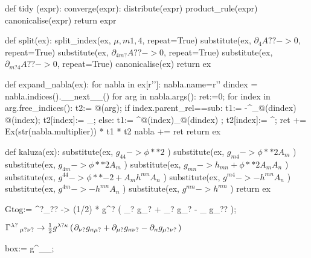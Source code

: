 \documentclass[10pt]{article}
\newcommand\brwrap[3]{%
  \setbox0=\hbox{$#2$}
  \left#1\vbox to \the\ht0{\hbox to 0pt{}}\right.\kern-.2em
  \begingroup #2\endgroup\kern-.15em
  \left.\vbox to \the\ht0{\hbox to 0pt{}}\right#3
}
\begin{document}
\begin{python}
def tidy (expr):
   converge(expr):
       distribute(expr)
       product_rule(expr)
       canonicalise(expr)
   return expr
\end{python}
\begin{python}
def split(ex):
	split_index(ex, $\mu, m1, 4$, repeat=True)
	substitute(ex, $\partial_{4}{A??} -> 0$, repeat=True)
	substitute(ex, $\partial_{4 m?}{A??} -> 0$, repeat=True)
	substitute(ex, $\partial_{m? 4}{A??} -> 0$, repeat=True)
	canonicalise(ex)
	return ex
\end{python}
\begin{python}
def expand_nabla(ex):
    for nabla in ex[r'\nabla']:
        nabla.name=r'\partial'
        dindex = nabla.indices().__next__() 
        for arg in nabla.args():             
            ret:=0;
            for index in arg.free_indices():
                t2:= @(arg);
                if index.parent_rel==sub:
                    t1:= -\Gamma^{\rho}_{@(dindex) @(index)};
                    t2[index]:= _{\rho};
                else:
                    t1:=  \Gamma^{@(index)}_{@(dindex) \rho};
                    t2[index]:= ^{\rho};
                ret += Ex(str(nabla.multiplier)) * t1 * t2
            nabla += ret
    return ex
\end{python}
\begin{python}
def kaluza(ex):
	substitute(ex, $g_{4 4} -> \phi**{2}$ )
	substitute(ex, $g_{m 4} -> \phi**{2} A_{m}$ )
	substitute(ex, $g_{4 m} -> \phi**{2} A_{m}$ )
	substitute(ex, $g_{m n} -> h_{m n} + \phi**{2} A_{m} A_{n}$ )
	substitute(ex, $g^{4 4} -> \phi**{-2} +  A_{m} h^{m n} A_{n}$ )
	substitute(ex, $g^{m 4} -> - h^{m n} A_{n}$ )
	substitute(ex, $g^{4 m} -> - h^{m n} A_{n}$ )
	substitute(ex, $g^{m n} -> h^{m n}$ )
	return ex
\end{python}
\begin{python}
Gtog:= \Gamma^{\lambda?}_{\mu?\nu?} ->
  (1/2) * g^{\lambda?\kappa} ( 
        \partial_{\nu?}{ g_{\kappa\mu?} } + \partial_{\mu?}{ g_{\kappa\nu?} } - \partial_{\kappa}{ g_{\mu?\nu?} } );
\end{python}
\begin{adjustwidth}{1em}{0cm}${}\Gamma^{\lambda?}\,_{\mu? \nu?} \rightarrow \frac{1}{2}g^{\lambda? \kappa} \brwrap{(}{\partial_{\nu?}{g_{\kappa \mu?}}+\partial_{\mu?}{g_{\kappa \nu?}}-\partial_{\kappa}{g_{\mu? \nu?}}}{)}$\end{adjustwidth}
\begin{python}
box:= g^{\mu \nu}\nabla_{\mu}{\nabla_{\nu}{\pi}};
\end{python}
\end{document}
